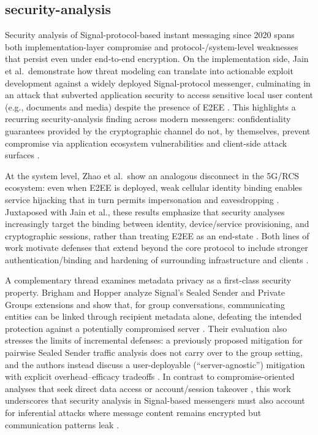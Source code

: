 \subsection{security-analysis}
Security analysis of Signal-protocol-based instant messaging since 2020 spans both implementation-layer compromise and protocol-/system-level weaknesses that persist even under end-to-end encryption. On the implementation side, Jain et al.\ demonstrate how threat modeling can translate into actionable exploit development against a widely deployed Signal-protocol messenger, culminating in an attack that subverted application security to access sensitive local user content (e.g., documents and media) despite the presence of E2EE \cite{jain2021}. This highlights a recurring security-analysis finding across modern messengers: confidentiality guarantees provided by the cryptographic channel do not, by themselves, prevent compromise via application ecosystem vulnerabilities and client-side attack surfaces \cite{jain2021}.

At the system level, Zhao et al.\ show an analogous disconnect in the 5G/RCS ecosystem: even when E2EE is deployed, weak cellular identity binding enables service hijacking that in turn permits impersonation and eavesdropping \cite{zhao2022}. Juxtaposed with Jain et al., these results emphasize that security analyses increasingly target the binding between identity, device/service provisioning, and cryptographic sessions, rather than treating E2EE as an end-state \cite{jain2021,zhao2022}. Both lines of work motivate defenses that extend beyond the core protocol to include stronger authentication/binding and hardening of surrounding infrastructure and clients \cite{jain2021,zhao2022}.

A complementary thread examines metadata privacy as a first-class security property. Brigham and Hopper analyze Signal’s Sealed Sender and Private Groups extensions and show that, for group conversations, communicating entities can be linked through recipient metadata alone, defeating the intended protection against a potentially compromised server \cite{brigham2025}. Their evaluation also stresses the limits of incremental defenses: a previously proposed mitigation for pairwise Sealed Sender traffic analysis does not carry over to the group setting, and the authors instead discuss a user-deployable (“server-agnostic”) mitigation with explicit overhead--efficacy tradeoffs \cite{brigham2025}. In contrast to compromise-oriented analyses that seek direct data access \cite{jain2021} or account/session takeover \cite{zhao2022}, this work underscores that security analysis in Signal-based messengers must also account for inferential attacks where message content remains encrypted but communication patterns leak \cite{brigham2025}.


